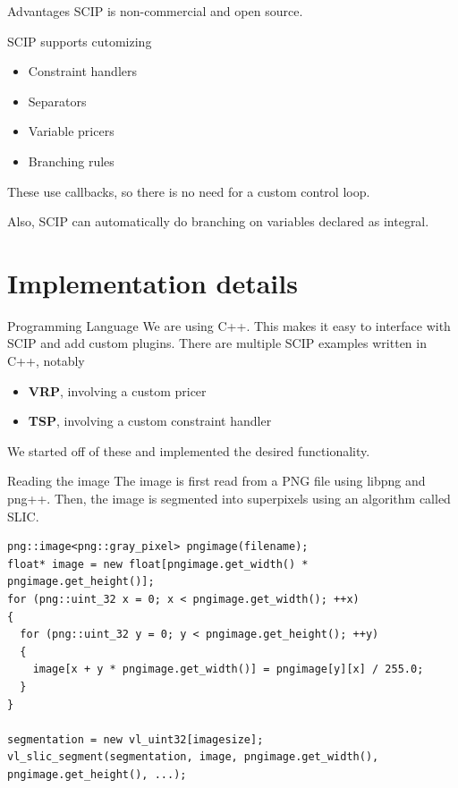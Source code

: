 \documentclass[fleqn]{beamer}
\begin{document}
    \begin{frame}{Advantages}
        SCIP is non-commercial and open source.
    
        SCIP supports cutomizing
        \begin{itemize}
            \item Constraint handlers %
            \item Separators
            \item Variable pricers
            \item Branching rules
        \end{itemize}
        These use callbacks, so there is no need for a custom control loop.
        
        Also, SCIP can automatically do branching on variables declared as integral.
    \end{frame}
	
	\section{Implementation details}
    \begin{frame}{Programming Language}
        We are using C++.
        This makes it easy to interface with SCIP and add custom plugins.
        There are multiple SCIP examples written in C++, notably
        \begin{itemize}
            \item \textbf{VRP}, involving a custom pricer %
            \item \textbf{TSP}, involving a custom constraint handler %
        \end{itemize}
        We started off of these and implemented the desired functionality.
    \end{frame}

\begin{frame}[fragile]{Reading the image}
The image is first read from a PNG file using libpng and png++.
Then, the image is segmented into superpixels using an algorithm called SLIC. %

\begin{verbatim}
png::image<png::gray_pixel> pngimage(filename);
float* image = new float[pngimage.get_width() * pngimage.get_height()];
for (png::uint_32 x = 0; x < pngimage.get_width(); ++x)
{
  for (png::uint_32 y = 0; y < pngimage.get_height(); ++y)
  {
    image[x + y * pngimage.get_width()] = pngimage[y][x] / 255.0;
  }
}

segmentation = new vl_uint32[imagesize];
vl_slic_segment(segmentation, image, pngimage.get_width(), pngimage.get_height(), ...);
\end{verbatim}
\end{frame}
\end{document}
